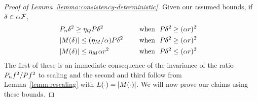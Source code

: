 \begin{proof}[Proof of Lemma~\ref{lemma:consistency-deterministic}]
Given our assumed bounds, if $\delta \in \alpha \mathcal{F}$, 
\begin{equation}
\label{eq:rewritten-ratio-bounds}
\begin{aligned}
& \Pn \delta^2 \ge \eta_Q \P \delta^2 && \quad \text{ when }\ \P \delta^2 \ge (\alpha r)^2 \\ 
&\abs{M(\delta)} \le (\eta_M/\alpha) \P \delta^2  && \quad \text{ when }\ \P \delta^2 \ge (\alpha r)^2  \\
&\abs{M(\delta)} \le \eta_M \alpha r^2 && \quad \text{ when }\ \P \delta^2 \le (\alpha r)^2  \\
\end{aligned}
\end{equation}
The first of these is an immediate consequence of the invariance of the ratio $\Pn f^2 / \P f^2$ to scaling
and the second and third follow from Lemma~\ref{lemm:rescaling} with $L(\cdot)=\lvert M(\cdot)\rvert$.  We will now prove our claims using these bounds.


\end{proof}
